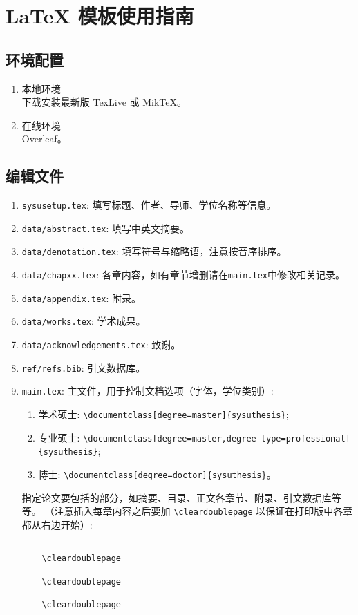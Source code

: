 \chapter{\LaTeX{} 模板使用指南}

\section{环境配置}
\begin{enumerate}
    \item 本地环境\\
    下载安装最新版 TexLive 或 MikTeX。
    \item 在线环境\\
    Overleaf。
\end{enumerate}

\section{编辑文件}
\begin{enumerate}
    \item \texttt{sysusetup.tex}: 填写标题、作者、导师、学位名称等信息。
    \item \texttt{data/abstract.tex}: 填写中英文摘要。
    \item \texttt{data/denotation.tex}: 填写符号与缩略语，注意按音序排序。
    \item \texttt{data/chapxx.tex}: 各章内容，如有章节增删请在\texttt{main.tex}中修改相关记录。
    \item \texttt{data/appendix.tex}: 附录。
    \item \texttt{data/works.tex}: 学术成果。
    \item \texttt{data/acknowledgements.tex}: 致谢。
    \item \texttt{ref/refs.bib}: 引文数据库。
    \item \texttt{main.tex}: 主文件，用于控制文档选项（字体，学位类别）:
    \begin{enumerate}
        \item 学术硕士: \verb|\documentclass[degree=master]{sysuthesis}|;
        \item 专业硕士: \verb|\documentclass[degree=master,degree-type=professional]{sysuthesis}|;
        \item 博士: \verb|\documentclass[degree=doctor]{sysuthesis}|。
    \end{enumerate}
    指定论文要包括的部分，如摘要、目录、正文各章节、附录、引文数据库等等。
    （注意插入每章内容之后要加 \verb|\cleardoublepage| 以保证在打印版中各章都从右边开始）:
    \begin{verbatim}
    
    \cleardoublepage
    
    \cleardoublepage
    
    \cleardoublepage
    \end{verbatim}
\end{enumerate}


